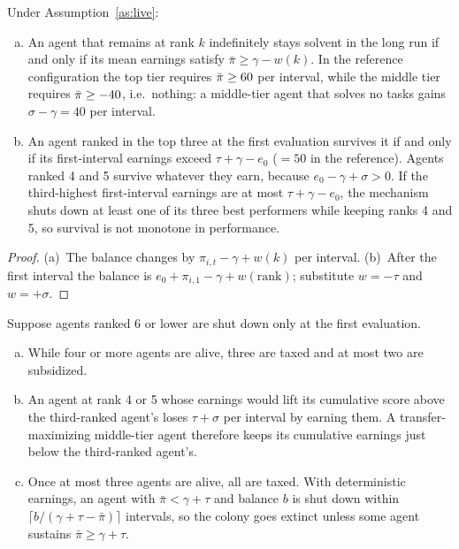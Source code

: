 \begin{proposition}[Viability]
\label{prop:viability}
Under Assumption~\ref{as:live}:
\begin{enumerate}[(a)]
  \item An agent that remains at rank $k$ indefinitely stays solvent in the long run if and only if its mean earnings satisfy $\bar\pi\ge\gamma-w(k)$.
  In the reference configuration the top tier requires $\bar\pi\ge60$ per interval, while the middle tier requires $\bar\pi\ge-40$, i.e.\ nothing: a middle-tier agent that solves no tasks gains $\sigma-\gamma=40$ per interval.
  \item An agent ranked in the top three at the first evaluation survives it if and only if its first-interval earnings exceed $\tau+\gamma-e_0$ ($=50$ in the reference). Agents ranked 4 and 5 survive whatever they earn, because $e_0-\gamma+\sigma>0$.
  If the third-highest first-interval earnings are at most $\tau+\gamma-e_0$, the mechanism shuts down at least one of its three best performers while keeping ranks 4 and 5, so survival is not monotone in performance.
\end{enumerate}
\end{proposition}

\begin{proof}
(a)~The balance changes by $\pi_{i,t}-\gamma+w(k)$ per interval.
(b)~After the first interval the balance is $e_0+\pi_{i,1}-\gamma+w(\mathrm{rank})$; substitute $w=-\tau$ and $w=+\sigma$.
\end{proof}

\begin{proposition}
\label{prop:postcull}
Suppose agents ranked 6 or lower are shut down only at the first evaluation.
\begin{enumerate}[(a)]
  \item While four or more agents are alive, three are taxed and at most two are subsidized.
  \item An agent at rank 4 or 5 whose earnings would lift its cumulative score above the third-ranked agent's loses $\tau+\sigma$ per interval by earning them. A transfer-maximizing middle-tier agent therefore keeps its cumulative earnings just below the third-ranked agent's.
  \item Once at most three agents are alive, all are taxed. With deterministic earnings, an agent with $\bar\pi<\gamma+\tau$ and balance $b$ is shut down within $\lceil b/(\gamma+\tau-\bar\pi)\rceil$ intervals, so the colony goes extinct unless some agent sustains $\bar\pi\ge\gamma+\tau$.
\end{enumerate}
\end{proposition}

